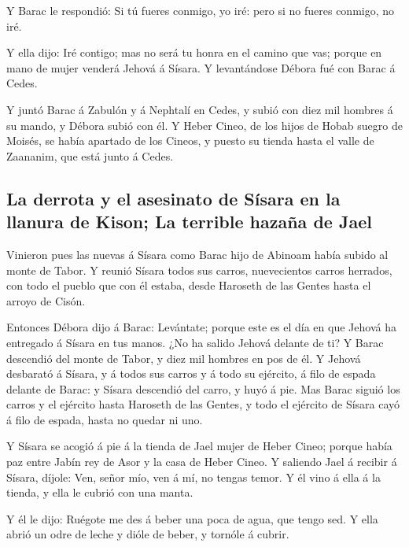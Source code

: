  Y Barac le respondió: Si tú fueres conmigo, yo iré: pero
si no fueres conmigo, no iré.

 Y ella dijo: Iré contigo; mas no será tu honra en el
camino que vas; porque en mano de mujer venderá Jehová á Sísara. Y
levantándose Débora fué con Barac á Cedes.

 Y juntó Barac á Zabulón y á Nephtalí en Cedes, y subió
con diez mil hombres á su mando, y Débora subió con él. 
Y Heber Cineo, de los hijos de Hobab suegro de Moisés, se había apartado
de los Cineos, y puesto su tienda hasta el valle de Zaananim, que está
junto á Cedes.

\hypertarget{la-derrota-y-el-asesinato-de-suxedsara-en-la-llanura-de-kison-la-terrible-hazauxf1a-de-jael}{%
\subsection{La derrota y el asesinato de Sísara en la llanura de Kison;
La terrible hazaña de
Jael}\label{la-derrota-y-el-asesinato-de-suxedsara-en-la-llanura-de-kison-la-terrible-hazauxf1a-de-jael}}

 Vinieron pues las nuevas á Sísara como Barac hijo de
Abinoam había subido al monte de Tabor.  Y reunió Sísara
todos sus carros, nuevecientos carros herrados, con todo el pueblo que
con él estaba, desde Haroseth de las Gentes hasta el arroyo de Cisón.

 Entonces Débora dijo á Barac: Levántate; porque este es
el día en que Jehová ha entregado á Sísara en tus manos. ¿No ha salido
Jehová delante de ti? Y Barac descendió del monte de Tabor, y diez mil
hombres en pos de él.  Y Jehová desbarató á Sísara, y á
todos sus carros y á todo su ejército, á filo de espada delante de
Barac: y Sísara descendió del carro, y huyó á pie.  Mas
Barac siguió los carros y el ejército hasta Haroseth de las Gentes, y
todo el ejército de Sísara cayó á filo de espada, hasta no quedar ni
uno.

 Y Sísara se acogió á pie á la tienda de Jael mujer de
Heber Cineo; porque había paz entre Jabín rey de Asor y la casa de Heber
Cineo.  Y saliendo Jael á recibir á Sísara, díjole: Ven,
señor mío, ven á mí, no tengas temor. Y él vino á ella á la tienda, y
ella le cubrió con una manta.

 Y él le dijo: Ruégote me des á beber una poca de agua,
que tengo sed. Y ella abrió un odre de leche y dióle de beber, y tornóle
á cubrir.

